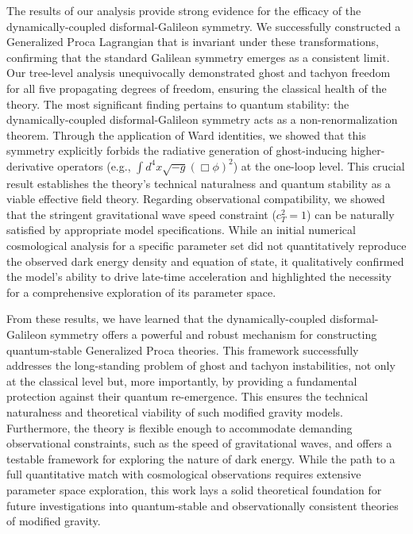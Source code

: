 \documentclass[twocolumn]{aastex631}
\begin{document}
The results of our analysis provide strong evidence for the efficacy of the dynamically-coupled disformal-Galileon symmetry. We successfully constructed a Generalized Proca Lagrangian that is invariant under these transformations, confirming that the standard Galilean symmetry emerges as a consistent limit. Our tree-level analysis unequivocally demonstrated ghost and tachyon freedom for all five propagating degrees of freedom, ensuring the classical health of the theory. The most significant finding pertains to quantum stability: the dynamically-coupled disformal-Galileon symmetry acts as a non-renormalization theorem. Through the application of Ward identities, we showed that this symmetry explicitly forbids the radiative generation of ghost-inducing higher-derivative operators (e.g., $\int d^4x \sqrt{-g} (\Box \phi)^2$) at the one-loop level. This crucial result establishes the theory's technical naturalness and quantum stability as a viable effective field theory. Regarding observational compatibility, we showed that the stringent gravitational wave speed constraint ($c_T^2=1$) can be naturally satisfied by appropriate model specifications. While an initial numerical cosmological analysis for a specific parameter set did not quantitatively reproduce the observed dark energy density and equation of state, it qualitatively confirmed the model's ability to drive late-time acceleration and highlighted the necessity for a comprehensive exploration of its parameter space.

From these results, we have learned that the dynamically-coupled disformal-Galileon symmetry offers a powerful and robust mechanism for constructing quantum-stable Generalized Proca theories. This framework successfully addresses the long-standing problem of ghost and tachyon instabilities, not only at the classical level but, more importantly, by providing a fundamental protection against their quantum re-emergence. This ensures the technical naturalness and theoretical viability of such modified gravity models. Furthermore, the theory is flexible enough to accommodate demanding observational constraints, such as the speed of gravitational waves, and offers a testable framework for exploring the nature of dark energy. While the path to a full quantitative match with cosmological observations requires extensive parameter space exploration, this work lays a solid theoretical foundation for future investigations into quantum-stable and observationally consistent theories of modified gravity.

{}

\end{document}
